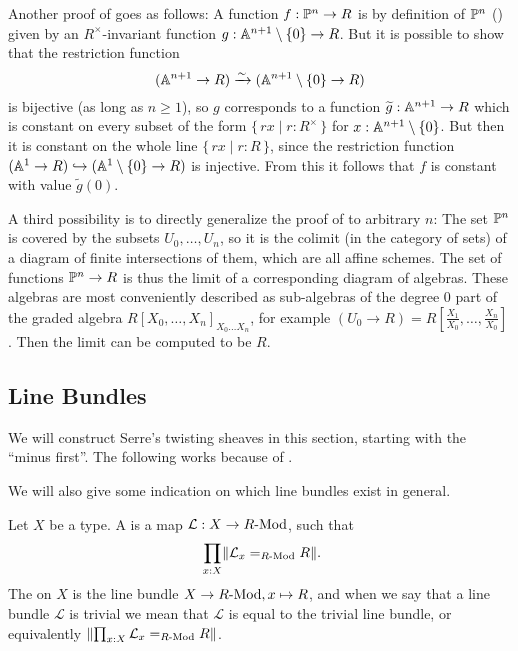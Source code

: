 \begin{remark}
  Another proof of 
  goes as follows:
  A function $f : \mathbb{P}^n \to R$
  is by definition of $\mathbb{P}^n$
  ()
  given by an $R^{\times}$-invariant function
  $g : \mathbb{A}^{n+1}\setminus\{0\} \to R$.
  But it is possible to show that the restriction function
  \[ (\mathbb{A}^{n+1} \to R) \xrightarrow{\sim} (\mathbb{A}^{n+1}\setminus\{0\} \to R) \]
  is bijective
  (as long as $n \geq 1$),
  so $g$ corresponds to a function $\widetilde{g} : \mathbb{A}^{n+1} \to R$
  which is constant on every subset of the form
  $\{\, rx \mid r : R^{\times} \,\}$
  for $x : \mathbb{A}^{n+1} \setminus \{0\}$.
  But then it is constant on the whole line
  $\{\, rx \mid r : R \,\}$,
  since the restriction function
  $(\mathbb{A}^1 \to R) \hookrightarrow (\mathbb{A}^1\setminus\{0\} \to R)$
  is injective.
  From this it follows that $f$ is constant with value $\widetilde{g}(0)$.

  A third possibility is to directly generalize the proof of
   to arbitrary $n$:
  The set $\mathbb{P}^n$ is covered by the subsets $U_0, \dots, U_n$,
  so it is the colimit (in the category of sets) of a diagram
  of finite intersections of them,
  which are all affine schemes.
  The set of functions $\mathbb{P}^n \to R$
  is thus the limit of a corresponding diagram of algebras.
  These algebras are most conveniently described as sub-algebras
  of the degree $0$ part of the graded algebra
  ${R[X_0, \dots, X_n]}_{X_0 \dots X_n}$,
  for example
  $(U_0 \to R) = R[\frac{X_1}{X_0}, \dots, \frac{X_n}{X_0}]$.
  Then the limit can be computed to be $R$.
\end{remark}


\subsection{Line Bundles}

We will construct Serre's twisting sheaves in this section,
starting with the ``minus first''.
The following works because of .

We will also give some indication on which line bundles exist in general.

\begin{definition}%
  Let $X$ be a type.
  A  is a map $\mathcal L : X\to R\text{-}\mathrm{Mod}$,
  such that
  \[ \prod_{x:X} \propTrunc{\mathcal L_x=_{\Mod{R}}R} \rlap{.}\]
  The  on $X$ is the line bundle
  $X \to R\text{-}\mathrm{Mod}, x \mapsto R$,
  and when we say that a line bundle $\mathcal{L}$ is trivial
  we mean that $\mathcal{L}$ is equal to the trivial line bundle,
  or equivalently $\lVert \prod_{x:X} \mathcal L_x=_{R\text{-}\mathrm{Mod}}R \rVert$.
\end{definition}

